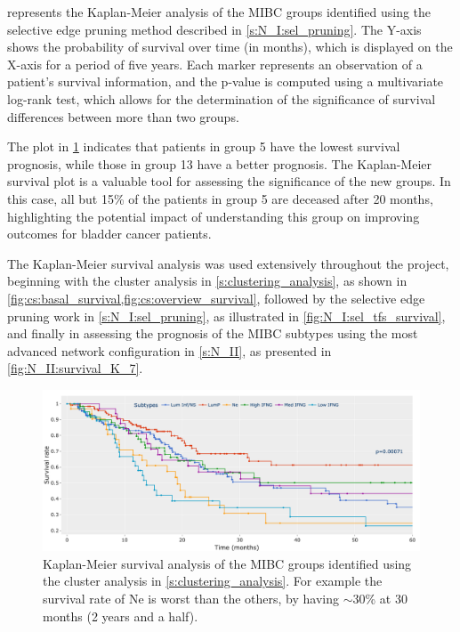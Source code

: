  represents the Kaplan-Meier analysis of the MIBC groups identified using the selective edge pruning method described in \cref{s:N_I:sel_pruning}. The Y-axis shows the probability of survival over time (in months), which is displayed on the X-axis for a period of five years. Each marker represents an observation of a patient's survival information, and the p-value is computed using a multivariate log-rank test, which allows for the determination of the significance of survival differences between more than two groups.

The plot in \cref{fig:lit:surival_eg} indicates that patients in group 5 have the lowest survival prognosis, while those in group 13 have a better prognosis. The Kaplan-Meier survival plot is a valuable tool for assessing the significance of the new groups. In this case, all but 15\% of the patients in group 5 are deceased after 20 months, highlighting the potential impact of understanding this group on improving outcomes for bladder cancer patients.

The Kaplan-Meier survival analysis was used extensively throughout the project, beginning with the cluster analysis in \cref{s:clustering_analysis}, as shown in \cref{fig:cs:basal_survival,fig:cs:overview_survival}, followed by the selective edge pruning work in \cref{s:N_I:sel_pruning}, as illustrated in \cref{fig:N_I:sel_tfs_survival}, and finally in assessing the prognosis of the MIBC subtypes using the most advanced network configuration in \cref{s:N_II}, as presented in \cref{fig:N_II:survival_K_7}.


\begin{figure}[!htb]
    \centering
    \includegraphics[width=1.0\textwidth, keepaspectratio]{Sections/ClusteringAnalysis/Resources/discussion/survival_K_6.png}
    \caption[Example - Kaplan-Meier]{Kaplan-Meier survival analysis of the MIBC groups identified using the cluster analysis in \cref{s:clustering_analysis}. For example the survival rate of Ne is worst than the others, by having $\sim$30\% at 30 months (2 years and a half).}
    \label{fig:lit:surival_eg}
\end{figure}
